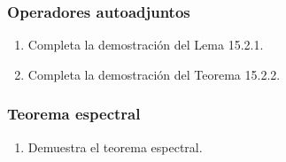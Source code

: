\documentclass[12pt,dvipsnames]{article}
\begin{document}
\subsubsection{Operadores autoadjuntos} \label{Sssec: Operadores autoadjuntos}
\begin{enumerate}
    \item Completa la demostración del Lema 15.2.1.
    \item Completa la demostración del Teorema 15.2.2.
\end{enumerate}

\subsubsection{Teorema espectral}

\begin{enumerate}
    \item Demuestra el teorema espectral.
\end{enumerate}
\end{document}
